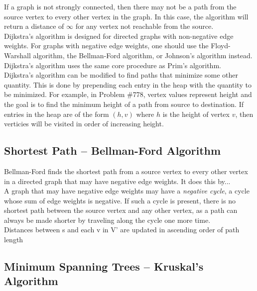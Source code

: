 \documentclass[12pt, titlepage]{article}
\begin{document}
If a graph is not strongly connected, then there may not be a path from the source vertex to every other vertex in the graph. In this case, the algorithm will return a distance of $\infty$ for any vertex not reachable from the source. \\

Dijkstra's algorithm is designed for directed graphs with non-negative edge weights. For graphs with negative edge weights, one should use the Floyd-Warshall algorithm, the Bellman-Ford algorithm, or Johnson's algorithm instead. \\

Dijkstra's algorithm uses the same core procedure as Prim's algorithm. \\

Dijkstra's algorithm can be modified to find paths that minimize some other quantity. This is done by prepending each entry in the heap with the quantity to be minimized. For example, in Problem \#778, vertex values represent height and the goal is to find the minimum height of a path from source to destination. If entries in the heap are of the form $(h, v)$ where $h$ is the height of vertex $v$, then verticies will be visited in order of increasing height.

\subsection{Shortest Path -- Bellman-Ford Algorithm} \label{bellman-ford}

Bellman-Ford finds the shortest path from a source vertex to every other vertex in a directed graph that may have negative edge weights. It does this by... \\

A graph that may have negative edge weights may have a \textit{negative cycle}, a cycle whose sum of edge weights is negative. If such a cycle is present, there is no shortest path between the source vertex and any other vertex, as a path can always be made shorter by traveling along the cycle one more time. \\

Distances between s and each v in V' are updated in ascending order of path length

\subsection{Minimum Spanning Trees -- Kruskal's Algorithm} \label{kruskal}
\end{document}
